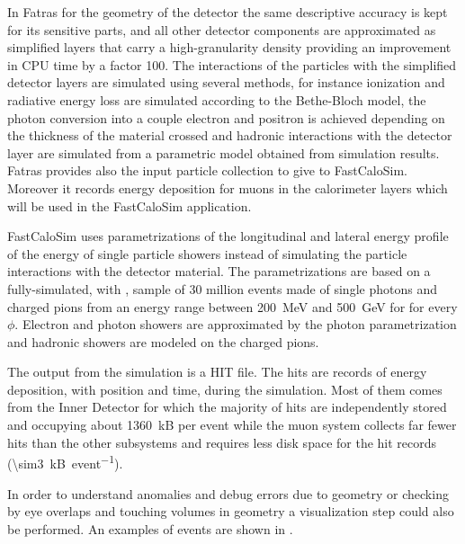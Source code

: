 In Fatras for the geometry of the detector the same descriptive accuracy is kept for its sensitive parts, and all other detector components are approximated as simplified layers that carry a high-granularity density providing an improvement in CPU time by a factor \num{100}. The interactions of the particles with the simplified detector layers are simulated using several methods, for instance ionization and radiative energy loss are simulated according to the Bethe-Bloch model, the photon conversion into a couple electron and positron is achieved depending on the thickness of the material crossed and hadronic interactions with the detector layer are simulated from a parametric model obtained from \geant simulation results. Fatras provides also the input particle collection to give to FastCaloSim. Moreover it records energy deposition for muons in the calorimeter layers which will be used in the FastCaloSim application.

FastCaloSim uses parametrizations of the longitudinal and lateral energy profile of the energy of single particle showers instead of simulating the particle interactions with the detector material. The parametrizations are based on a fully-simulated, with \geant, sample of 30 million events made of single photons and charged pions from an energy range between \SI{200}{\MeV} and \SI{500}{\GeV} for  for every $\phi$. Electron and photon showers are approximated by the photon parametrization and hadronic showers are modeled on the charged pions.

The output from the simulation is a HIT file. The hits are records of energy deposition, with position and time, during the simulation. Most of them comes from the Inner Detector for which the majority of hits are independently stored and occupying about \SI{1360}{kB} per event while the muon system collects far fewer hits than the other subsystems and requires less disk space for the hit records (\SI{\sim3}{kB\per event}).

In order to understand anomalies and debug errors due to geometry or checking by eye overlaps and touching volumes in geometry a visualization step could also be performed. An examples of events are shown in \Fig{\ref{fig:simulation}}.

